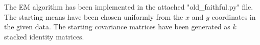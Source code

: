The EM algorithm has been implemented in the attached "old\_faithful.py" file. The starting means have been chosen uniformly from the $x$ and $y$ coordinates in the given data. The starting covariance matrices have been generated as $k$ stacked identity matrices.
